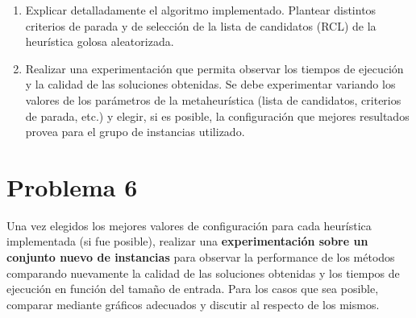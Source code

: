 \documentclass[11pt, a4paper, twoside]{article}
\begin{document}
	 \begin{enumerate}
	 
		\item Explicar detalladamente el algoritmo implementado. Plantear distintos criterios de parada y de selección de la 
			  lista de candidatos (RCL) de la heurística golosa aleatorizada.
			  
		\item Realizar una experimentación que permita observar los tiempos de ejecución y la calidad de las soluciones
			  obtenidas. Se debe experimentar variando los valores de los parámetros de la metaheurística (lista de candidatos,
			  criterios de parada, etc.) y elegir, si es posible, la configuración que mejores resultados provea para el
			  grupo de instancias utilizado.
			  
	 \end{enumerate}



\newpage
\section{Problema 6}
	Una vez elegidos los mejores valores de configuración para cada heurística implementada (si fue posible), realizar
	una \textbf{experimentación sobre un conjunto nuevo de instancias} para observar la performance de los métodos comparando
	nuevamente la calidad de las soluciones obtenidas y los tiempos de ejecución en función del tamaño de entrada. Para
	los casos que sea posible, comparar mediante gráficos adecuados y discutir al respecto de los mismos.


\end{document}
